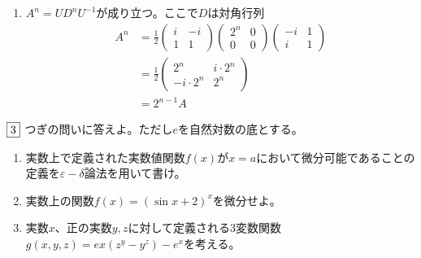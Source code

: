 \documentclass[dvipdfmx]{jsreport}
\renewcommand{\epsilon}{\varepsilon} %
\newcounter{num}[section]
\begin{document}
\begin{answer}
\begin{enumerate}
\begin{equation*}
\end{equation*}
	これをみたすような$U$は$\frac{1}{\sqrt{2}}\begin{pmatrix}i& -i\\1& 1\end{pmatrix}$
	\item $A^n= UD^nU^{-1}$が成り立つ。ここで$D$は対角行列
\begin{align*}
	A^n
	&= \frac{1}{2}\begin{pmatrix}i& -i\\ 1& 1\end{pmatrix}\begin{pmatrix}2^n& 0\\ 0& 0\end{pmatrix}\begin{pmatrix}-i& 1\\ i& 1\end{pmatrix}\\
	&= \frac{1}{2}\begin{pmatrix}2^n& i\cdot 2^n\\ -i\cdot 2^n& 2^n\end{pmatrix}\\
	&= 2^{n- 1}A
\end{align*}
\end{enumerate}
\end{answer}

\begin{tcolorbox} %
	$\fbox{3}$ つぎの問いに答えよ。ただし$e$を自然対数の底とする。
\begin{enumerate}
	\item 実数上で定義された実数値関数$f(x)$が$x= a$において微分可能であることの定義を$\epsilon- \delta$論法を用いて書け。
	\item 実数上の関数$f(x)= (\sin{x}+ 2)^x$を微分せよ。
	\item 実数$x$、正の実数$y, z$に対して定義される3変数関数$g(x, y, z)= ex(z^y- y^z)- e^x$を考える。
\end{enumerate}
\end{tcolorbox}
\end{document}
